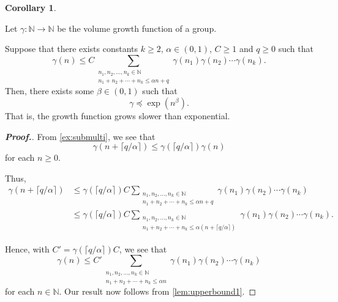 \documentclass[11pt,a4paper,reqno]{amsart}
\theoremstyle{plain}
\theoremstyle{definition}
\newtheorem{corollary}{Corollary}[theorem]
\theoremstyle{definition}
\newenvironment{myproof}{\begin{proof}[\normalfont\bfseries Proof.]}{\end{proof}}
\renewcommand\leq\leqslant
\renewcommand\geq\geqslant
\begin{document}
%
%
%

\begin{corollary}\label{cor:upper_bound_tool}

\smallskip
Let $\gamma\colon \mathbb N \to \mathbb N$ be the volume growth function of a group.

Suppose that there exists constants $k \geq 2$, $\alpha \in (0,1)$, $C\geq 1$ and $q \geq 0$ such that
\begin{equation}\label{eq:lower_bound2}
  \gamma(n)
  \leq
  C
  \sum_{\substack{n_1,n_2,\ldots,n_k\in \mathbb{N}\\n_1+n_2+\cdots+n_k \leq \alpha n+q}}
  \gamma(n_1) \gamma(n_2)\cdots \gamma(n_k).
\end{equation}
Then, there exists some $\beta\in (0,1)$ such that
\[
  \gamma \preccurlyeq \exp(n^\beta).
\]
That is, the growth function grows slower than exponential.
\end{corollary}

\begin{myproof}
From \cref{ex:submulti}, we see that
\[
  \gamma(n+\lceil q /\alpha\rceil) \leq \gamma(\lceil q/\alpha\rceil) \gamma(n)
\]
for each $n \geq 0$.

Thus,
\begin{align*}
  \gamma(n+\lceil q /\alpha\rceil)
  &\leq
  \gamma(\lceil q/\alpha\rceil) C
  \sum_{\substack{n_1,n_2,\ldots,n_k\in \mathbb{N}\\n_1+n_2+\cdots+n_k \leq \alpha n+q}}
  \gamma(n_1) \gamma(n_2)\cdots \gamma(n_k)
  \\
  &\leq
  \gamma(\lceil q/\alpha\rceil) C
  \sum_{\substack{n_1,n_2,\ldots,n_k\in \mathbb{N}\\n_1+n_2+\cdots+n_k \leq \alpha (n+\lceil q/\alpha \rceil)}}
  \gamma(n_1) \gamma(n_2)\cdots \gamma(n_k).
\end{align*}

Hence, with $C' = \gamma(\lceil q/\alpha\rceil) C$, we see that
\[
  \gamma(n)
  \leq
  C'\sum_{\substack{n_1,n_2,\ldots,n_k\in \mathbb{N}\\n_1+n_2+\cdots+n_k \leq \alpha n}}
  \gamma(n_1) \gamma(n_2)\cdots \gamma(n_k)
\]
for each $n \in \mathbb N$.
Our result now follows from \cref{lem:upperbound1}.
\end{myproof}
\end{document}
